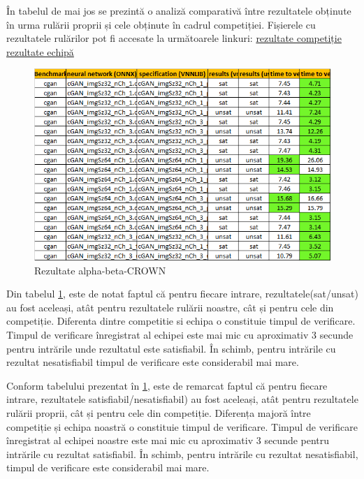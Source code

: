 În tabelul de mai jos se prezintă o analiză comparativă între rezultatele obținute în urma rulării proprii și cele obținute în cadrul competiției. Fișierele cu rezultatele rulărilor pot fi accesate la următoarele linkuri:
\href{https://docs.google.com/spreadsheets/d/1iGJHwePCzW0axJIwVes_eiN3R4ppvNu-ndrO_Fy5dL0/edit#gid=1265769327}{rezultate competiție }
\href{https://docs.google.com/spreadsheets/d/1kSxunni8qgQLT6ZkCRWvSO2VMy2Hz7qA/edit#gid=1476783028}{rezultate echipă}

\begin{figure}[h]
\centering 
\includegraphics[width=0.8\linewidth]{imagini/interpretare rezultate/abC_comp_vs_us.png}
\caption{Rezultate alpha-beta-CROWN}
\label{fig:image1} 
\end{figure}

Din tabelul \ref{fig:image1}, este de notat faptul că pentru fiecare intrare, rezultatele(sat/unsat) au fost aceleași, atât pentru rezultatele rulării noastre, cât și pentru cele din competiție. Diferenta dintre competitie si echipa o constituie timpul de verificare. Timpul de verificare înregistrat al echipei este mai mic cu aproximativ 3 secunde pentru intrările unde rezultatul este satisfiabil. În schimb, pentru intrările cu rezultat nesatisfiabil timpul de verificare este considerabil mai mare.

Conform tabelului prezentat în \ref{fig:image1}, este de remarcat faptul că pentru fiecare intrare, rezultatele satisfiabil/nesatisfiabil) au fost aceleași, atât pentru rezultatele rulării proprii, cât și pentru cele din competiție. Diferența majoră între competiție și echipa noastră o constituie timpul de verificare. Timpul de verificare înregistrat al echipei noastre este mai mic cu aproximativ 3 secunde pentru intrările cu rezultat satisfiabil. În schimb, pentru intrările cu rezultat nesatisfiabil, timpul de verificare este considerabil mai mare.